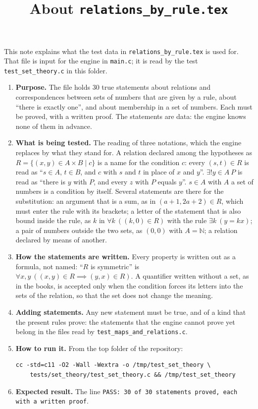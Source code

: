 \documentclass[11pt,a4paper]{article}
\title{About \texttt{relations\_by\_rule.tex}}
\author{}
\date{}
\begin{document}
\maketitle
This note explains what the test data in \texttt{relations\_by\_rule.tex} is used for. That file is input for the engine in \texttt{main.c}; it is read by the test \texttt{test\_set\_theory.c} in this folder.

\begin{enumerate}
\item \textbf{Purpose.} The file holds 30 true statements about relations and correspondences between sets of numbers that are given by a rule, about ``there is exactly one'', and about membership in a set of numbers. Each must be proved, with a written proof. The statements are data: the engine knows none of them in advance.

\item \textbf{What is being tested.} The reading of three notations, which the engine replaces by what they stand for. A relation declared among the hypotheses as $R = \{(x, y) \in A \times B \mid c\}$ is a name for the condition $c$: every $(s, t) \in R$ is read as ``$s \in A$, $t \in B$, and $c$ with $s$ and $t$ in place of $x$ and $y$''. $\exists! y \in A\ P$ is read as ``there is $y$ with $P$, and every $z$ with $P$ equals $y$''. $s \in A$ with $A$ a set of numbers is a condition by itself. Several statements are there for the substitution: an argument that is a sum, as in $(a + 1, 2a + 2) \in R$, which must enter the rule with its brackets; a letter of the statement that is also bound inside the rule, as $k$ in $\forall k\ ((k, 0) \in R)$ with the rule $\exists k\ (y = kx)$; a pair of numbers outside the two sets, as $(0, 0)$ with $A = \mathbb{N}$; a relation declared by means of another.

\item \textbf{How the statements are written.} Every property is written out as a formula, not named: ``$R$ is symmetric'' is $\forall x, y\ ((x, y) \in R \implies (y, x) \in R)$. A quantifier written without a set, as in the books, is accepted only when the condition forces its letters into the sets of the relation, so that the set does not change the meaning.

\item \textbf{Adding statements.} Any new statement must be true, and of a kind that the present rules prove: the statements that the engine cannot prove yet belong in the files read by \texttt{test\_maps\_and\_relations.c}.

\item \textbf{How to run it.} From the top folder of the repository:
\begin{verbatim}
cc -std=c11 -O2 -Wall -Wextra -o /tmp/test_set_theory \
    tests/set_theory/test_set_theory.c && /tmp/test_set_theory
\end{verbatim}

\item \textbf{Expected result.} The line \texttt{PASS: 30 of 30 statements proved, each with a written proof}.
\end{enumerate}
\end{document}
